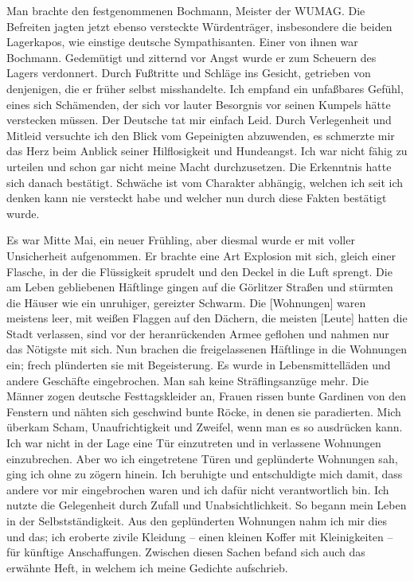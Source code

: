 \documentclass[a4paper,12pt,ngerman,
]{nisebook}
\begin{document}
Man brachte den festgenommenen Bochmann, Meister der WUMAG. 
Die Befreiten jagten jetzt ebenso versteckte Würdenträger, insbesondere die beiden Lagerkapos, wie einstige deutsche Sympathisanten. Einer von ihnen war Bochmann. Gedemütigt und zitternd vor Angst wurde er zum Scheuern des Lagers verdonnert. Durch Fußtritte und Schläge ins Gesicht, getrieben von denjenigen, die er früher selbst misshandelte. Ich empfand ein unfaßbares Gefühl, eines sich Schämenden, der sich vor lauter Besorgnis vor seinen Kumpels hätte verstecken müssen. Der Deutsche tat mir einfach Leid. Durch Verlegenheit und Mitleid versuchte ich den Blick vom Gepeinigten abzuwenden, es schmerzte mir das Herz beim Anblick seiner Hilflosigkeit und Hundeangst. Ich war nicht fähig zu urteilen und schon gar nicht meine Macht durchzusetzen. Die Erkenntnis hatte sich danach bestätigt. Schwäche ist vom Charakter abhängig, welchen ich seit ich denken kann nie versteckt habe und welcher nun durch diese Fakten bestätigt wurde.

Es war Mitte Mai, ein neuer Frühling, aber diesmal wurde er mit voller Unsicherheit aufgenommen. Er brachte eine Art Explosion mit sich, gleich einer Flasche, in der die Flüssigkeit sprudelt und den Deckel in die Luft sprengt. Die am Leben gebliebenen Häftlinge gingen auf die Görlitzer Straßen und stürmten die Häuser wie ein unruhiger, gereizter Schwarm. Die [Wohnungen] waren meistens leer, mit weißen Flaggen auf den Dächern, die meisten [Leute] hatten die Stadt verlassen, sind vor der heranrückenden Armee geflohen und nahmen nur das Nötigste  mit sich. Nun brachen die freigelassenen Häftlinge in die Wohnungen ein; frech plünderten sie mit Begeisterung. Es wurde in Lebensmittelläden und andere Geschäfte eingebrochen. Man sah keine Sträflingsanzüge mehr. Die Männer zogen deutsche Festtagskleider an, Frauen rissen bunte Gardinen von den Fenstern und nähten sich geschwind bunte Röcke, in denen sie paradierten. Mich überkam Scham, Unaufrichtigkeit und Zweifel, wenn man es so ausdrücken kann. Ich war nicht in der Lage eine Tür einzutreten und in verlassene Wohnungen einzubrechen. Aber wo ich eingetretene Türen und geplünderte Wohnungen sah, ging ich ohne zu zögern hinein. Ich beruhigte und entschuldigte mich damit, dass andere vor mir eingebrochen waren und ich dafür nicht verantwortlich bin. Ich nutzte die Gelegenheit durch Zufall und Unabsichtlichkeit. So begann mein Leben in der Selbstständigkeit. Aus den geplünderten Wohnungen nahm ich mir dies und das; ich eroberte zivile Kleidung -- einen kleinen Koffer mit Kleinigkeiten -- für künftige Anschaffungen. Zwischen diesen Sachen befand sich auch das erwähnte Heft, in welchem ich meine Gedichte aufschrieb.
\end{document}
